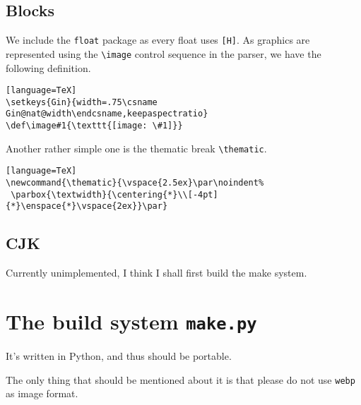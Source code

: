 \section{Blocks}
We include the \verb!float! package as every float uses \verb![H]!. As graphics are represented using the \verb!\image! control sequence in the parser, we have the following definition.\par
\begin{verbatim}[language=TeX]
\setkeys{Gin}{width=.75\csname Gin@nat@width\endcsname,keepaspectratio}
\def\image#1{\texttt{[image: \#1]}}
\end{verbatim}
Another rather simple one is the thematic break \verb!\thematic!.\par
\begin{verbatim}[language=TeX]
\newcommand{\thematic}{\vspace{2.5ex}\par\noindent%
 \parbox{\textwidth}{\centering{*}\\[-4pt]{*}\enspace{*}\vspace{2ex}}\par}
\end{verbatim}
\section{CJK}
Currently unimplemented, I think I shall first build the make system.\par
\chapter{The build system \texttt{make.py}}
It's written in Python, and thus should be portable.\par
The only thing that should be mentioned about it is that please do not use \verb!webp! as image format.\par
